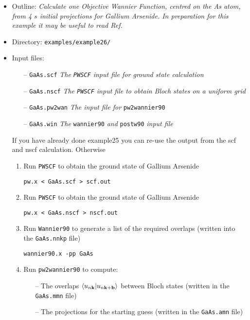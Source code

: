 \documentclass[a4paper,11pt,twoside]{article}
\begin{document}
\begin{itemize}

\item Outline: \textit{Calculate one Objective Wannier Function, centred on the As atom, from 4 $s$ initial projections for Gallium Arsenide. In preparation for this example it may be useful to read Ref.
\cite{Marianetti} }



\item Directory: \verb|examples/example26/|


\item Input files:

\begin{itemize}

\item[--] \verb|GaAs.scf| \textit{The {\tt PWSCF} input file for ground state calculation}
\item[--] \verb|GaAs.nscf| \textit{The {\tt PWSCF} input file to obtain Bloch states on a uniform grid}
\item[--] \verb|GaAs.pw2wan| \textit{The input file for} \verb|pw2wannier90|
\item[--] \verb|GaAs.win| \textit{The} \verb|wannier90| \textit{and} \verb|postw90| \textit{input file}


\end{itemize}

If you have already done example25 you can re-use the output from the scf and nscf calculation. Otherwise 

\begin{enumerate}

\item Run {\tt PWSCF} to obtain the ground state of Gallium Arsenide

\verb|pw.x < GaAs.scf > scf.out|


\item Run {\tt PWSCF} to obtain the ground state of Gallium Arsenide

\verb|pw.x < GaAs.nscf > nscf.out|

\item Run {\tt Wannier90} to generate a list of the required overlaps (written into the \verb|GaAs.nnkp| file)

\verb|wannier90.x -pp GaAs|


\item Run {\tt pw2wannier90} to compute:

\begin{itemize}
\item[--] The overlaps $\langle u_{n\bf{k}}|u_{n\bf{k+b}}\rangle$ between  
Bloch states (written in the \verb|GaAs.mmn| file) 
\item[--] The projections for the starting guess (written in the \verb|GaAs.amn| file)


\end{itemize}
\end{enumerate}
\end{itemize}
\end{document}
